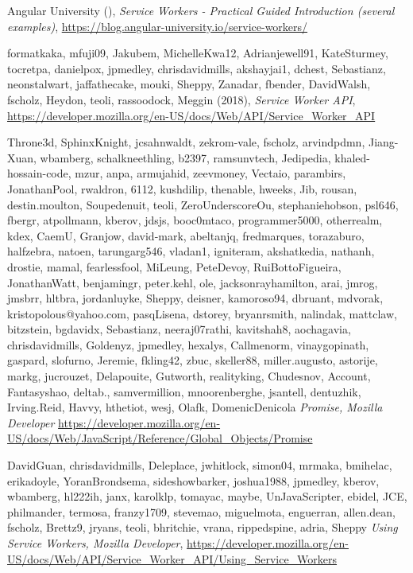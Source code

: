 \documentclass[11pt ,a4paper , twoside , openright ]{article}
\begin{document}

\begin{thebibliography}{99}

	
	\bibitem{}
	Angular University (),
	\emph{Service Workers - Practical Guided Introduction (several examples)},
	\url{https://blog.angular-university.io/service-workers/}
	
	\bibitem{}
	formatkaka, mfuji09, Jakubem, MichelleKwa12, Adrianjewell91, KateSturmey, tocretpa, danielpox, jpmedley, chrisdavidmills, akshayjai1, dchest, Sebastianz, neonstalwart, jaffathecake, mouki, Sheppy, Zanadar, fbender, DavidWalsh, fscholz, Heydon, teoli, rassoodock, Meggin (2018),
	\emph{Service Worker API},
	\url{https://developer.mozilla.org/en-US/docs/Web/API/Service_Worker_API}
	
	\bibitem{}
	Throne3d, SphinxKnight, jcsahnwaldt, zekrom-vale, fscholz, arvindpdmn, Jiang-Xuan, wbamberg, schalkneethling, b2397, ramsunvtech, Jedipedia, khaled-hossain-code, mzur, anpa, armujahid, zeevmoney, Vectaio, parambirs, JonathanPool, rwaldron, 6112, kushdilip, thenable, hweeks, Jib, rousan, destin.moulton, Soupedenuit, teoli, ZeroUnderscoreOu, stephaniehobson, psl646, fbergr, atpollmann, kberov, jdsjs, booc0mtaco, programmer5000, otherrealm, kdex, CaemU, Granjow, david-mark, abeltanjq, fredmarques, torazaburo, halfzebra, natoen, tarungarg546, vladan1, igniteram, akshatkedia, nathanh, drostie, mamal, fearlessfool, MiLeung, PeteDevoy, RuiBottoFigueira, JonathanWatt, benjamingr, peter.kehl, ole, jacksonrayhamilton, arai, jmrog, jmsbrr, hltbra, jordanluyke, Sheppy, deisner, kamoroso94, dbruant, mdvorak, kristopolous@yahoo.com, pasqLisena, dstorey, bryanrsmith, nalindak, mattclaw, bitzstein, bgdavidx, Sebastianz, neeraj07rathi, kavitshah8, aochagavia, chrisdavidmills, Goldenyz, jpmedley, hexalys, Callmenorm, vinaygopinath, gaspard, slofurno, Jeremie, fkling42, zbuc, skeller88, miller.augusto, astorije, markg, jucrouzet, Delapouite, Gutworth, realityking, Chudesnov, Account, Fantasyshao, deltab., samvermillion, mnoorenberghe, jsantell, dentuzhik, Irving.Reid, Havvy, hthetiot, wesj, Olafk, DomenicDenicola
	\emph{Promise, Mozilla Developer}
	\url{https://developer.mozilla.org/en-US/docs/Web/JavaScript/Reference/Global_Objects/Promise}
	
	\bibitem{}
	DavidGuan, chrisdavidmills, Deleplace, jwhitlock, simon04, mrmaka, bmihelac, erikadoyle, YoranBrondsema, sideshowbarker, joshua1988, jpmedley, kberov, wbamberg, hl222ih, janx, karolklp, tomayac, maybe, UnJavaScripter, ebidel, JCE, philmander, termosa, franzy1709, stevemao, miguelmota, enguerran, allen.dean, fscholz, Brettz9, jryans, teoli, bhritchie, vrana, rippedspine, adria, Sheppy
	\emph{Using Service Workers, Mozilla Developer},
	\url{https://developer.mozilla.org/en-US/docs/Web/API/Service_Worker_API/Using_Service_Workers}
	

\end{thebibliography}
\end{document}
